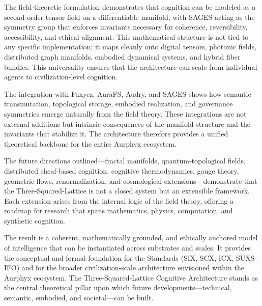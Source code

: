 The field‑theoretic formulation demonstrates that cognition can be modeled as a second‑order tensor field on a differentiable manifold, with SAGES acting as the symmetry group that enforces invariants necessary for coherence, reversibility, accessibility, and ethical alignment. This mathematical structure is not tied to any specific implementation; it maps cleanly onto digital tensors, photonic fields, distributed graph manifolds, embodied dynamical systems, and hybrid fiber bundles. This universality ensures that the architecture can scale from individual agents to civilization‑level cognition.

The integration with Fuxyez, AuraFS, Audry, and SAGES shows how semantic transmutation, topological storage, embodied realization, and governance symmetries emerge naturally from the field theory. These integrations are not external additions but intrinsic consequences of the manifold structure and the invariants that stabilize it. The architecture therefore provides a unified theoretical backbone for the entire Aurphyx ecosystem.

The future directions outlined---fractal manifolds, quantum‑topological fields, distributed sheaf‑based cognition, cognitive thermodynamics, gauge theory, geometric flows, renormalization, and cosmological extensions---demonstrate that the Three‑Squared‑Lattice is not a closed system but an extensible framework. Each extension arises from the internal logic of the field theory, offering a roadmap for research that spans mathematics, physics, computation, and synthetic cognition.

The result is a coherent, mathematically grounded, and ethically anchored model of intelligence that can be instantiated across substrates and scales. It provides the conceptual and formal foundation for the Standards (SIX, SCX, ICX, SUXS-IFO) and for the broader civilization‑scale architecture envisioned within the Aurphyx ecosystem. The Three‑Squared‑Lattice Cognitive Architecture stands as the central theoretical pillar upon which future developments---technical, semantic, embodied, and societal---can be built.
